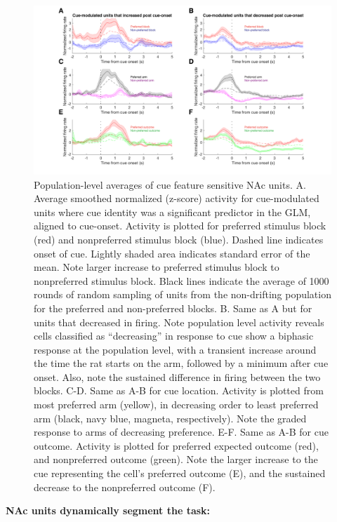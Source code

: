\documentclass[11pt]{article}
\begin{document}
\begin{figure}[h]
\centering
\includegraphics[width=\textwidth]{Fig 7 - Population averages.png}
\caption{Population-level averages of cue feature sensitive NAc units. A. Average smoothed normalized (z-score) activity for cue-modulated units where cue identity was a significant predictor in the GLM, aligned to cue-onset. Activity is plotted for preferred stimulus block (red) and nonpreferred stimulus block (blue). Dashed line indicates onset of cue. Lightly shaded area indicates standard error of the mean. Note larger increase to preferred stimulus block to nonpreferred stimulus block. Black lines indicate the average of 1000 rounds of random sampling of units from the non-drifting population for the preferred and non-preferred blocks. B. Same as A but for units that decreased in firing. Note population level activity reveals cells classified as “decreasing” in response to cue show a biphasic response at the population level, with a transient increase around the time the rat starts on the arm, followed by a minimum after cue onset. Also, note the sustained difference in firing between the two blocks. C-D. Same as A-B for cue location. Activity is plotted from most preferred arm (yellow), in decreasing order to least preferred arm (black, navy blue, magneta, respectively). Note the graded response to arms of decreasing preference. E-F. Same as A-B for cue outcome. Activity is plotted for preferred expected outcome (red), and nonpreferred outcome (green). Note the larger increase to the cue representing the cell’s preferred outcome (E), and the sustained decrease to the nonpreferred outcome (F).}
\label{fig:pop}
\end{figure}

{\bf NAc units dynamically segment the task:}
\end{document}

